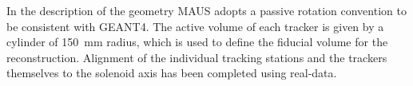   In the description of the geometry MAUS adopts a passive rotation convention to be consistent with GEANT4.  The active volume of each tracker is given by a cylinder of 150~mm radius, which is used to define the fiducial volume for the reconstruction. Alignment of the individual tracking stations and the trackers themselves to the solenoid axis has been completed using real-data.
  
  
  
